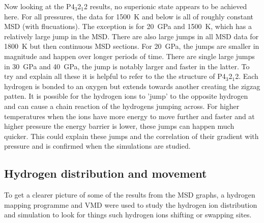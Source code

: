 \documentclass[a4paper,12pt]{article}
\begin{document}
Now looking at the P4$_3$2$_1$2 results, no superionic state appears to be achieved here. For all pressures, the data for \SI{1500}{\K} and below is all of roughly constant MSD (with flucuations). The exception is for \SI{20}{\GPa} and \SI{1500}{\K}, which has a relatively large jump in the MSD. There are also large jumps in all MSD data for \SI{1800}{\K} but then continuous MSD sections. For \SI{20}{\GPa}, the jumps are smaller in magnitude and happen over longer periods of time. There are single large jumps in \SI{30}{\GPa} and \SI{40}{\GPa}, the jump is notably larger and faster in the latter. To try and explain all these it is helpful to refer to the the structure of P4$_3$2$_1$2. Each hydrogen is bonded to an oxygen but extends towards another creating the zigzag patten. It is possible for the hydrogen ions to 'jump' to the opposite hydrogen and can cause a chain reaction of the hydrogens jumping across. For higher temperatures when the ions have more energy to move further and faster and at higher pressure the energy barrier is lower, these jumps can happen much quicker. This could explain these jumps and the correlation of their gradient with pressure and is confirmed when the simulations are studied.


\subsection{Hydrogen distribution and movement}

To get a clearer picture of some of the results from the MSD graphs, a hydrogen mapping programme and VMD were used to study the hydrogen ion distribution and simulation to look for things such hydrogen ions shifting or swapping sites.
\end{document}
